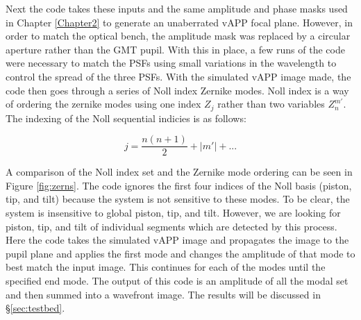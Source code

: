 Next the code takes these inputs and the same amplitude and phase masks used in Chapter \ref{Chapter2} to generate an unaberrated vAPP focal plane.  However, in order to match the optical bench, the amplitude mask was replaced by a circular aperture rather than the GMT pupil.  With this in place, a few runs of the code were necessary to match the PSFs using small variations in the wavelength to control the spread of the three PSFs.  With the simulated vAPP image made, the code then goes through a series of Noll index Zernike modes.  Noll index is a way of ordering the zernike modes using one index $Z_j$ rather than two variables $Z_n^{m'}$\cite{Noll1976ZERNIKETURBULENCE.}.  The indexing of the Noll sequential indicies is as follows:

\begin{equation}
    j = \frac{n(n+1)}{2} + |m'| + ...
    \label{eq:noll}
\end{equation}

A comparison of the Noll index set and the Zernike mode ordering can be seen in Figure \ref{fig:zerns}.  The code ignores the first four indices of the Noll basis (piston, tip, and tilt) because the system is not sensitive to these modes.  To be clear, the system is insensitive to global piston, tip, and tilt.  However, we are looking for piston, tip, and tilt of individual segments which are detected by this process.  Here the code takes the simulated vAPP image and propagates the image to the pupil plane and applies the first mode and changes the amplitude of that mode to best match the input image.  This continues for each of the modes until the specified end mode.  The output of this code is an amplitude of all the modal set and then summed into a wavefront image.  The results will be discussed in \S \ref{sec:testbed}.


